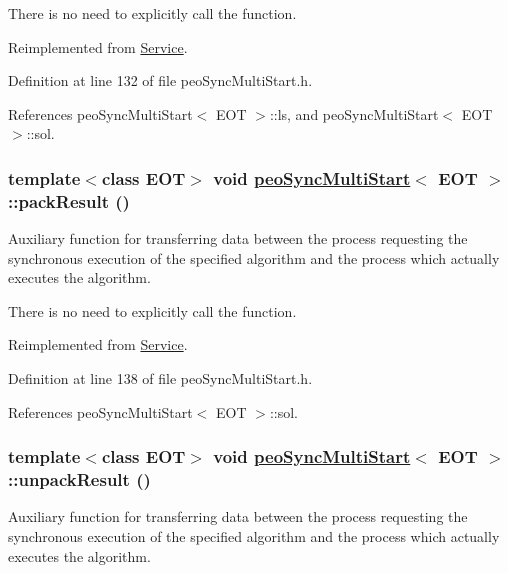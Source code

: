 There is no need to explicitly call the function. 

Reimplemented from \hyperlink{classService_e4f2894e6121e60f38d41cfbd7447ae4}{Service}.

Definition at line 132 of file peo\-Sync\-Multi\-Start.h.

References peo\-Sync\-Multi\-Start$<$ EOT $>$::ls, and peo\-Sync\-Multi\-Start$<$ EOT $>$::sol.\hypertarget{classpeoSyncMultiStart_6c48eb0dae741cff7203b65e226f9616}{
\subsubsection[packResult]{\setlength{\rightskip}{0pt plus 5cm}template$<$class EOT$>$ void \hyperlink{classpeoSyncMultiStart}{peo\-Sync\-Multi\-Start}$<$ EOT $>$::pack\-Result ()}}
\label{classpeoSyncMultiStart_6c48eb0dae741cff7203b65e226f9616}


Auxiliary function for transferring data between the process requesting the synchronous execution of the specified algorithm and the process which actually executes the algorithm. 

There is no need to explicitly call the function. 

Reimplemented from \hyperlink{classService_e5e4f90b2315e15c2a2913bd370f4cf5}{Service}.

Definition at line 138 of file peo\-Sync\-Multi\-Start.h.

References peo\-Sync\-Multi\-Start$<$ EOT $>$::sol.\hypertarget{classpeoSyncMultiStart_c3cbd1f10a89d1915c5ccf82a2c34a1d}{
\subsubsection[unpackResult]{\setlength{\rightskip}{0pt plus 5cm}template$<$class EOT$>$ void \hyperlink{classpeoSyncMultiStart}{peo\-Sync\-Multi\-Start}$<$ EOT $>$::unpack\-Result ()}}
\label{classpeoSyncMultiStart_c3cbd1f10a89d1915c5ccf82a2c34a1d}


Auxiliary function for transferring data between the process requesting the synchronous execution of the specified algorithm and the process which actually executes the algorithm. 

